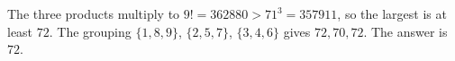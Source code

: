 The three products multiply to $9!=362880>71^3=357911$, so the largest is at least $72$. The grouping $\{1,8,9\}$, $\{2,5,7\}$, $\{3,4,6\}$ gives $72,70,72$. The answer is $\boxed{72}$.
